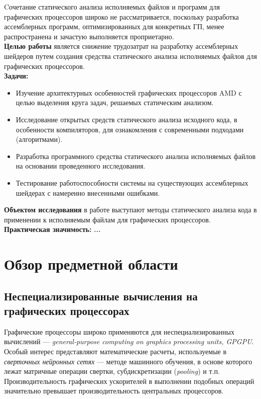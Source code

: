 \documentclass[a4paper,14pt]{extarticle}
\newcommand{\todo}[1]{\textbf{\textcolor{red}{#1}}}
\newenvironment{ul}{\begin{itemize}[noitemsep,topsep=0em]}{\end{itemize}\vspace{20pt}}
\begin{document}
Cочетание статического анализа исполняемых файлов и программ для графических
процессоров широко не рассматривается, поскольку разработка ассемблерных программ,
оптимизированных для конкретных ГП, менее распространена и зачастую выполняется
проприетарно.\\

\textbf{Целью работы} является снижение трудозатрат на разработку ассемблерных шейдеров
путем создания средства статического анализа исполняемых файлов для графических процессоров.\\

\textbf{Задачи:}
\begin{ul}
\item Изучение архитектурных особенностей графических процессоров AMD с целью выделения
круга задач, решаемых статическим анализом.
\item Исследование открытых средств статического анализа исходного кода, в особенности
компиляторов, для ознакомления с современными подходами (алгоритмами).
\item Разработка программного средства статического анализа исполняемых файлов
на основании проведенного исследования.
\item Тестирование работоспособности системы на существующих ассемблерных шейдерах
с намеренно внесенными ошибками.
\end{ul}

\textbf{Объектом исследования} в работе выступают методы статического анализа кода
в применении к исполняемым файлам для графических процессоров.\\

\textbf{Практическая значимость:} \todo{...}

\newpage
\section{Обзор предметной области}

\subsection{Неспециализированные вычисления на графических процессорах}

Графические процессоры широко применяются для неспециализированных вычислений —
\textit{general-purpose computing on graphics processing units, GPGPU}.
Особый интерес представляют математические расчеты, используемые в
\textit{сверточных нейронных сетях} — методе машинного обучения, в основе которого
лежат матричные операции свертки, субдискретизации (\textit{pooling}) и т.п.
Производительность графических ускорителей в выполнении подобных операций
значительно превышает производительность центральных процессоров.
\end{document}
